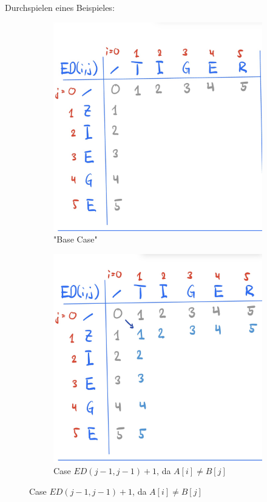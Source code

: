 \documentclass[a4paper]{article}
\begin{document}
Durchspielen eines Beispieles:
\begin{figure}[h]
\centering
\begin{subfigure}{0.45\textwidth}
    \includegraphics[width=\textwidth]{Pictures/ED0.jpg}
        \caption{"Base Case"}
        \label{fig:ED00}
\end{subfigure}
\hfill
\begin{subfigure}{0.45\textwidth}
 \includegraphics[width=\textwidth]{Pictures/ED1.jpg}  
 \caption{Case $ED(j-1, j-1) + 1$, da $A[i] \neq B[j]$}
        \label{fig:ED01}
\end{subfigure}


\end{figure}
\end{document}
